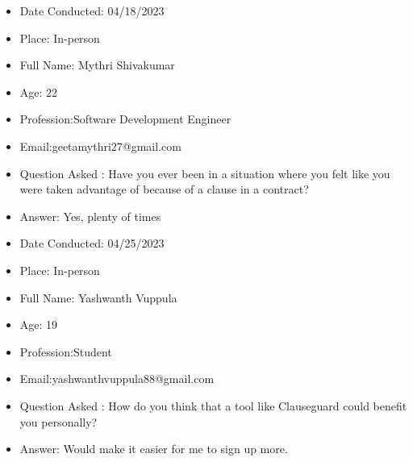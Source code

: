 \begin{itemize}
\item Date Conducted: 04/18/2023
\item Place: In-person
    \item Full Name: Mythri Shivakumar

    \item Age: 22

    \item Profession:Software Development Engineer 

    \item Email:geetamythri27@gmail.com

    \item Question Asked : Have you ever been in a situation where you felt like you were taken advantage of because of a clause in a contract?

    \item Answer: Yes, plenty of times 
\end{itemize}
\begin{itemize}
\item Date Conducted: 04/25/2023
\item Place: In-person
    \item Full Name: Yashwanth Vuppula  

    \item Age: 19

    \item Profession:Student 

    \item Email:yashwanthvuppula88@gmail.com

    \item Question Asked : How do you think that a tool like Clauseguard could benefit you personally?

    \item Answer: Would make it easier for me to sign up more.
\end{itemize}
